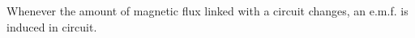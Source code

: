Whenever the amount of magnetic flux linked with a circuit changes, an e.m.f. is induced in circuit.